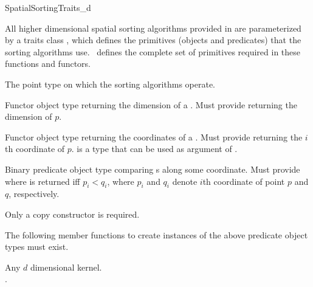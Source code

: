 

\begin{ccRefConcept}{SpatialSortingTraits_d}

\ccDefinition
  
All higher dimensional spatial sorting algorithms provided in \cgal{} are parameterized
by a traits class , which defines the
primitives (objects and predicates) that the sorting algorithms use.
\ccRefName\ defines the complete set of primitives required in these
functions and functors.

\ccTypes
\ccAutoIndexingOff
{}

%
       {The point type on which the sorting algorithms operate.
       }


%
       {Functor object type returning the dimension of a  .
       Must provide 
          returning the dimension of $p$. 
       }

%
       {Functor object type returning the coordinates of a  .
       Must provide 
          returning the $i$th
        coordinate of $p$.  is a type that can be used as
        argument of .
       }


%
       {Binary predicate object type comparing s
        along some coordinate.
        Must provide 
         where 
        is returned iff $p_i < q_i$,
        where $p_i$ and $q_i$ denote $i$th coordinate of point $p$ and $q$,
        respectively.
       }

\ccCreation
{}  %

Only a copy constructor is required.


\ccOperations

The following member functions to create instances of the above predicate
object types must exist. 

\setlength\parskip{0mm}

\ccParDims
\ccHasModels

Any \cgal{} $d$ dimensional kernel.\\
.

\ccParDims
\end{ccRefConcept}


